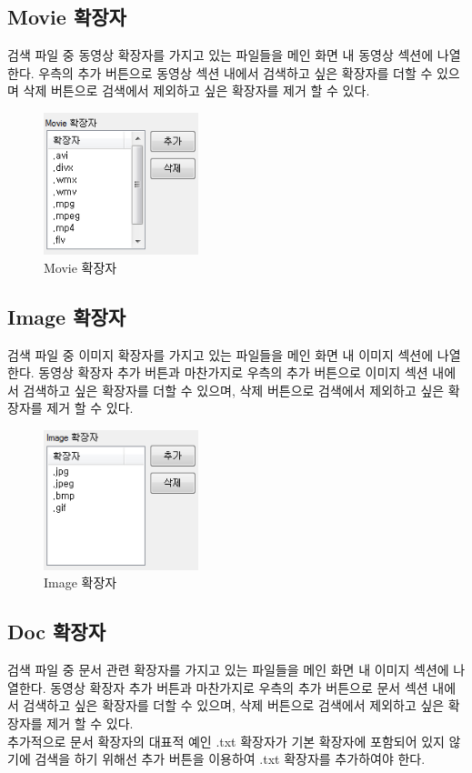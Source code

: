\documentclass[letterpaper, 11pt]{article} %
\begin{document}
	\subsection{Movie 확장자}
	검색 파일 중 동영상 확장자를 가지고 있는 파일들을 메인 화면 내 동영상 섹션에 나열한다. 우측의 추가 버튼으로 동영상 섹션 내에서 검색하고 싶은 확장자를 더할 수 있으며 삭제 버튼으로 검색에서 제외하고 싶은 확장자를 제거 할 수 있다.
	
	\begin{figure}[h]
		\centering
		\includegraphics[width=0.4\textwidth]{Figures/Movie}
		\caption{Movie 확장자}
		\label{fig:movie}
	\end{figure}

	\subsection{Image 확장자}
	검색 파일 중 이미지 확장자를 가지고 있는 파일들을 메인 화면 내 이미지 섹션에 나열한다. 동영상 확장자 추가 버튼과 마찬가지로 우측의 추가 버튼으로 이미지 섹션 내에서 검색하고 싶은 확장자를 더할 수 있으며, 삭제 버튼으로 검색에서 제외하고 싶은 확장자를 제거 할 수 있다.
	
	\begin{figure}[h]
		\centering
		\includegraphics[width=0.4\textwidth]{Figures/Image}
		\caption{Image 확장자}
		\label{fig:image}
	\end{figure}
	
	\subsection{Doc 확장자}		
	검색 파일 중 문서 관련 확장자를 가지고 있는 파일들을 메인 화면 내 이미지 섹션에 나열한다. 동영상 확장자 추가 버튼과 마찬가지로 우측의 추가 버튼으로 문서 섹션 내에서 검색하고 싶은 확장자를 더할 수 있으며, 삭제 버튼으로 검색에서 제외하고 싶은 확장자를 제거 할 수 있다.\\
	추가적으로 문서 확장자의 대표적 예인 .txt 확장자가 기본 확장자에 포함되어 있지 않기에 검색을 하기 위해선 추가 버튼을 이용하여 .txt 확장자를 추가하여야 한다.
	
\end{document}
